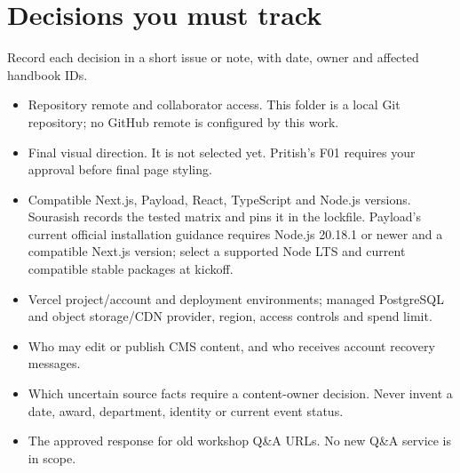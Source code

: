 \documentclass[11pt]{article}
\newcommand{\pathfile}[1]{\path{#1}}
\begin{document}
\section{Decisions you must track}
Record each decision in a short issue or \pathfile{docs/decisions/} note, with date, owner and affected handbook IDs.

\begin{itemize}
\item Repository remote and collaborator access. This folder is a local Git repository; no GitHub remote is configured by this work.
\item Final visual direction. It is not selected yet. Pritish's F01 requires your approval before final page styling.
\item Compatible Next.js, Payload, React, TypeScript and Node.js versions. Sourasish records the tested matrix and pins it in the lockfile. Payload's current official installation guidance requires Node.js 20.18.1 or newer and a compatible Next.js version; select a supported Node LTS and current compatible stable packages at kickoff.
\item Vercel project/account and deployment environments; managed PostgreSQL and object storage/CDN provider, region, access controls and spend limit.
\item Who may edit or publish CMS content, and who receives account recovery messages.
\item Which uncertain source facts require a content-owner decision. Never invent a date, award, department, identity or current event status.
\item The approved response for old workshop Q\&A URLs. No new Q\&A service is in scope.
\end{itemize}
\end{document}
